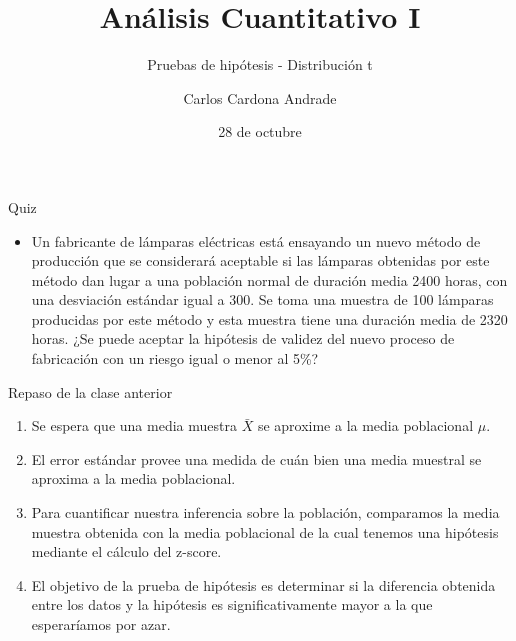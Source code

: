\documentclass{beamer}
\title{Análisis Cuantitativo I}
\subtitle{Pruebas de hipótesis - Distribución t}
\author[Carlos Cardona]{Carlos Cardona Andrade}
\institute[URosario]{Universidad del Rosario}
\date{28 de octubre}
\begin{document}
\frame{\titlepage}

\begin{frame}{Quiz}
	\begin{itemize}
		\justifying
\item Un fabricante de lámparas eléctricas está ensayando un nuevo método de producción que se considerará aceptable si las lámparas obtenidas por este método dan lugar a una población normal de duración media 2400 horas, con una desviación estándar igual a 300. Se toma una muestra de 100 lámparas producidas por este método y esta muestra tiene una duración media de 2320 horas. ¿Se puede aceptar la hipótesis de validez del nuevo proceso de fabricación con un riesgo igual o menor al 5\%?
	\end{itemize}
\end{frame}

\begin{frame}{Repaso de la clase anterior}
\begin{enumerate}
\justifying
\item Se espera que una media muestra $\bar{X}$ se aproxime a la media poblacional $\mu$.
\item El error estándar provee una medida de cuán bien una media muestral se aproxima a la media poblacional.
\item Para cuantificar nuestra inferencia sobre la población, comparamos la media muestra obtenida con la media poblacional de la cual tenemos una hipótesis mediante el cálculo del z-score.
\item El objetivo de la prueba de hipótesis es determinar si la diferencia obtenida entre los datos y la hipótesis es significativamente mayor a la que esperaríamos por azar.
\end{enumerate}
\end{frame}
\end{document}
